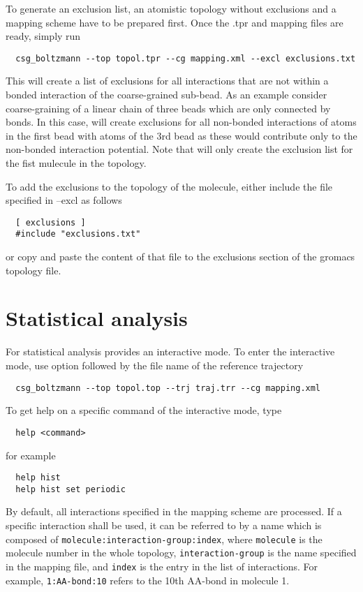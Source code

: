 To generate an exclusion list, an atomistic topology without exclusions and a mapping scheme have to be prepared first. Once the .tpr and mapping files are ready, simply run
\begin{verbatim}
  csg_boltzmann --top topol.tpr --cg mapping.xml --excl exclusions.txt
\end{verbatim}
This will create a list of exclusions for all interactions that are not within a bonded interaction of the coarse-grained sub-bead. As an example consider coarse-graining of a linear chain of three beads  which are only connected by bonds. In this case,  will create exclusions for all non-bonded interactions of atoms in the first bead with atoms of the 3rd bead as these would contribute only to the non-bonded interaction potential. Note that  will only create the exclusion list for the fist mulecule in the topology.

To add the exclusions to the \gromacs topology of the molecule, either include the file specified in --excl as follows
\begin{verbatim}
  [ exclusions ]
  #include "exclusions.txt"
\end{verbatim}
or copy and paste the content of that file to the exclusions section of the gromacs topology file.

\section{Statistical analysis}
For statistical analysis  provides an interactive mode. To enter the interactive mode, use  option followed by the file name of the reference trajectory 
\begin{verbatim}
  csg_boltzmann --top topol.top --trj traj.trr --cg mapping.xml
\end{verbatim}
%
To get help on a specific command of the interactive mode, type
\begin{verbatim}
  help <command>
\end{verbatim}
for example
\begin{verbatim}
  help hist
  help hist set periodic
\end{verbatim}
%
By default, all interactions specified in the mapping scheme are processed. If a specific interaction shall be used, it can be referred to by a name which is composed of \texttt{molecule:interaction-group:index}, where \texttt{molecule} is the molecule number in the whole topology, \texttt{interaction-group} is the name specified in the mapping file, and \texttt{index} is the entry in the list of interactions. For example, \texttt{1:AA-bond:10} refers to the 10th AA-bond in molecule 1. 

